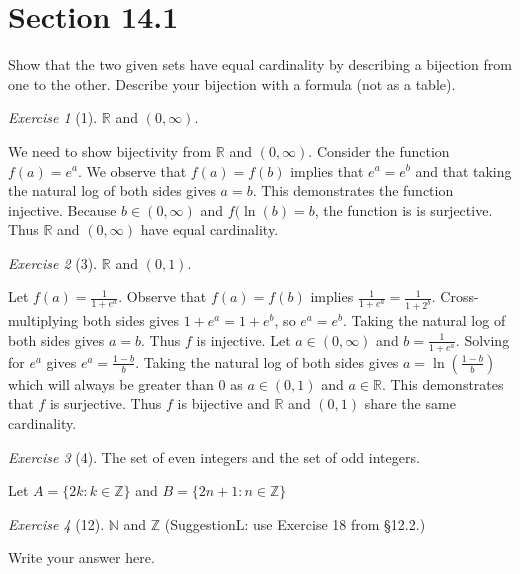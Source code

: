 \documentclass[12pt]{amsart}
\makeatletter
\theoremstyle{remark}
\newtheorem*{exercise}{Exercise}%
\def\RR{\ensuremath{\mathbb R}}
\def\NN{\ensuremath{\mathbb N}}
\def\ZZ{\ensuremath{\mathbb Z}}
\renewenvironment{proof}[1][\proofname]{\par\doublespacing
  \pushQED{\qed}%
  \normalfont \topsep6\p@\@plus6\p@\relax
  \list{}{%
    \settowidth{\leftmargin}{\itshape\proofname:\hskip\labelsep}%
    \setlength{\labelwidth}{0pt}%
    \setlength{\itemindent}{-\leftmargin}%
  }%
  \item[\hskip\labelsep\itshape#1\@addpunct{:}]\ignorespaces
}{%
  \popQED\endlist\@endpefalse
  \singlespacing
}
\theoremstyle{mycomment}
\makeatother
\begin{document}
\thispagestyle{fancy}

\section*{Section 14.1}
Show that the two given sets have equal cardinality by describing a bijection from one to the other. Describe your bijection with a formula (not as a table).
\begin{exercise}[1] $\RR$ and $(0,\infty)$.
\begin{proof}[Solution]
	We need to show bijectivity from $\RR$ and $(0, \infty)$. Consider the function $f(a) = e^a$. We observe that $f(a) = f(b)$ implies that $e^a = e^b$ and that taking the natural log of both sides gives $a = b$. This demonstrates the function injective. Because $b \in (0, \infty)$ and $f(\ln{(b)} = b$, the function is is surjective. Thus $\RR$ and $(0,\infty)$ have equal cardinality.
\end{proof}
\end{exercise}

\begin{exercise}[3] $\RR$ and $(0,1)$.
\begin{proof}[Solution]
	Let $f(a) = \frac{1}{1+e^{a}}$. Observe that $f(a) = f(b)$ implies $\frac{1}{1+e^{a}} = \frac{1}{1+2^{b}}$. Cross-multiplying both sides gives $1 + e^{a} = 1 + e^{b}$, so $e^a = e^b$. Taking the natural log of both sides gives $a = b$. Thus $f$ is injective. Let $a \in (0, \infty)$ and $b = \frac{1}{1+e^a}$. Solving for $e^a$ gives $e^a = \frac{1-b}{b}$. Taking the natural log of both sides gives $a = \ln{(\frac{1-b}{b})}$ which will always be greater than 0 as $a \in (0, 1)$ and $a \in \RR$. This demonstrates that $f$ is surjective. Thus $f$ is bijective and $\RR$ and $(0, 1)$ share the same cardinality.
\end{proof}
\end{exercise}

\begin{exercise}[4] The set of even integers and the set of odd integers.
\begin{proof}
	Let $A = \{2k: k \in \ZZ\}$ and $B = \{2n+1:n \in \ZZ \}$
\end{proof}
\end{exercise}

\begin{exercise}[12] $\NN$ and $\ZZ$ (SuggestionL: use Exercise 18 from \S12.2.)
\begin{proof}[Solution]
Write your answer here.
\end{proof}
\end{exercise}
\end{document}
